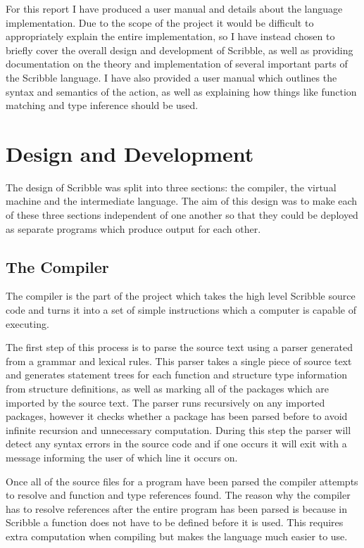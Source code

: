 \documentclass[]{final_report}
\begin{document}
For this report I have produced a user manual and details about the language implementation. Due to the scope of the project it would be difficult to appropriately explain the entire implementation, so I have instead chosen to briefly cover the overall design and development of Scribble, as well as providing documentation on the theory and implementation of several important parts of the Scribble language. I have also provided a user manual which outlines the syntax and semantics of the action, as well as explaining how things like function matching and type inference should be used.

\chapter{Design and Development}

The design of Scribble was split into three sections: the compiler, the virtual machine and the intermediate language. The aim of this design was to make each of these three sections independent of one another so that they could be deployed as separate programs which produce output for each other.

\section{The Compiler}

The compiler is the part of the project which takes the high level Scribble source code and turns it into a set of simple instructions which a computer is capable of executing. 

The first step of this process is to parse the source text using a parser generated from a grammar and  lexical rules. This parser takes a single piece of source text and generates statement trees for each function and structure type information from structure definitions, as well as marking all of the packages which are imported by the source text. The parser runs recursively on any imported packages, however it checks whether a package has been parsed before to avoid infinite recursion and unnecessary computation. During this step the parser will detect any syntax errors in the source code and if one occurs it will exit with a message informing the user of which line it occurs on.

Once all of the source files for a program have been parsed the compiler attempts to resolve and function and type references found. The reason why the compiler has to resolve references after the entire program has been parsed is because in Scribble a function does not have to be defined before it is used. This requires extra computation when compiling but makes the language much easier to use.
\end{document}
